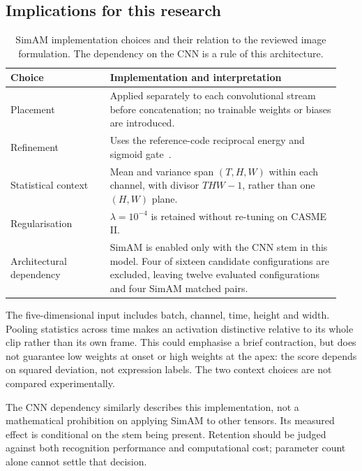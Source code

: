 \subsection{Implications for this research}
\label{sec:simam-implications}

\begin{table}[htbp]
    \centering
    \small
    \begin{tabular}{@{}p{0.29\linewidth} p{0.65\linewidth}@{}}
        \hline
        \textbf{Choice} & \textbf{Implementation and interpretation} \\
        \hline
        Placement & Applied separately to each convolutional stream before concatenation; no trainable weights or biases are introduced. \\
        Refinement & Uses the reference-code reciprocal energy and sigmoid gate~\cite{yang2021}. \\
        Statistical context & Mean and variance span $(T,H,W)$ within each channel, with divisor $THW-1$, rather than one $(H,W)$ plane. \\
        Regularisation & $\lambda=10^{-4}$ is retained without re-tuning on CASME II. \\
        Architectural dependency & SimAM is enabled only with the CNN stem in this model. Four of sixteen candidate configurations are excluded, leaving twelve evaluated configurations and four SimAM matched pairs. \\
        \hline
    \end{tabular}
    \caption[SimAM implementation choices]{SimAM implementation choices and their relation to the reviewed image formulation. The dependency on the CNN is a rule of this architecture.}
    \label{tab:simam-decisions}
\end{table}

The five-dimensional input includes batch, channel, time, height and width. Pooling statistics across time makes an activation distinctive relative to its whole clip rather than its own frame. This could emphasise a brief contraction, but does not guarantee low weights at onset or high weights at the apex: the score depends on squared deviation, not expression labels. The two context choices are not compared experimentally.

The CNN dependency similarly describes this implementation, not a mathematical prohibition on applying SimAM to other tensors. Its measured effect is conditional on the stem being present. Retention should be judged against both recognition performance and computational cost; parameter count alone cannot settle that decision.

